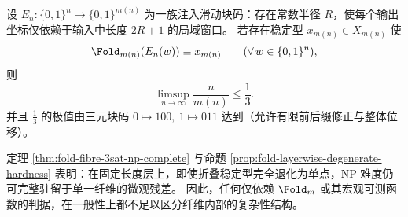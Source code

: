 \begin{conjecture}[局域注入块码的单纤维信息率上界]\label{conj:fold-local-injective-code-rate-cap}
设 \(E_n:\{0,1\}^n\to\{0,1\}^{m(n)}\) 为一族注入滑动块码：存在常数半径 \(R\)，使每个输出坐标仅依赖于输入中长度 \(2R+1\) 的局域窗口。
若存在稳定型 \(x_{m(n)}\in X_{m(n)}\) 使
\[
\Fold_{m(n)}(E_n(w))\equiv x_{m(n)}
\qquad(\forall\,w\in\{0,1\}^n),
\]
则
\[
\limsup_{n\to\infty}\frac{n}{m(n)}\le \frac13.
\]
并且 \(\frac13\) 的极值由三元块码
\(
0\mapsto 100,\ 1\mapsto 011
\)
达到（允许有限前后缀修正与整体位移）。
\end{conjecture}

\begin{remark}[方法学边界]
定理 \ref{thm:fold-fibre-3sat-np-complete} 与命题 \ref{prop:fold-layerwise-degenerate-hardness} 表明：在固定长度层上，即使折叠稳定型完全退化为单点，NP 难度仍可完整驻留于单一纤维的微观残差。
因此，任何仅依赖 \(\Fold_m\) 或其宏观可测函数的判据，在一般性上都不足以区分纤维内部的复杂性结构。
\end{remark}

\endinput
